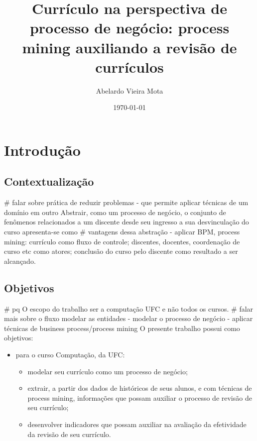 \documentclass[a4paper]{article}
\title{Currículo na perspectiva de processo de negócio: process mining auxiliando a revisão de currículos}
\author{Abelardo Vieira Mota}
\date{\today}
\begin{document}
\maketitle

\begin{abstract}
\lipsum[1]
\lipsum[2]
\end{abstract}

\tableofcontents

\section{Introdução}

\subsection{Contextualização}

\lipsum[3]
\lipsum[30]
\# falar sobre prática de reduzir problemas - que permite aplicar técnicas de um domínio em outro
Abstrair, como um processo de negócio, o conjunto de fenômenos relacionados a um discente desde seu ingresso a sua desvinculação do curso apresenta-se como \# vantagens dessa abstração - aplicar BPM, process mining: currículo como fluxo de controle; discentes, docentes, coordenação de curso etc como atores; conclusão do curso pelo discente como resultado a ser alcançado. 
\lipsum[5]
\lipsum[6]
\lipsum[7]

\subsection{Objetivos}

\# pq O escopo do trabalho ser a computação UFC e não todos os cursos.
\# falar mais sobre o fluxo modelar as entidades - modelar o processo de negócio - aplicar técnicas de business process/process mining
O presente trabalho possui como objetivos:

\begin{itemize}
\item para o curso Computação, da UFC:

\begin{itemize}
\item modelar seu currículo como um processo de negócio;
\item extrair, a partir dos dados de históricos de seus alunos, e com técnicas de process mining, informações que possam auxiliar o processo de revisão de seu currículo;
\item desenvolver indicadores que possam auxiliar na avaliação da efetividade da revisão de seu currículo.
\end{itemize}

\end{itemize}
\lipsum[12]
\lipsum[13]
\end{document}
